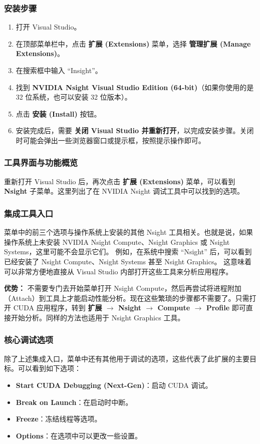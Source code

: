 \subsubsection{安装步骤}
\begin{enumerate}
    \item 打开 Visual Studio。
    \item 在顶部菜单栏中，点击 \textbf{扩展 (Extensions)} 菜单，选择 \textbf{管理扩展 (Manage Extensions)}。
    \item 在搜索框中输入 ``Insight''。
    \item 找到 \textbf{NVIDIA Nsight Visual Studio Edition (64-bit)}（如果你使用的是 32 位系统，也可以安装 32 位版本）。
    \item 点击 \textbf{安装 (Install)} 按钮。
    \item 安装完成后，需要 \textbf{关闭 Visual Studio 并重新打开}，以完成安装步骤。关闭时可能会弹出一些浏览器窗口或提示框，按照提示操作即可。
\end{enumerate}


\subsubsection{工具界面与功能概览}
重新打开 Visual Studio 后，再次点击 \textbf{扩展 (Extensions)} 菜单，可以看到 \textbf{Nsight} 子菜单。这里列出了在 NVIDIA Nsight 调试工具中可以找到的选项。

\subsubsection{集成工具入口}
菜单中的前三个选项与操作系统上安装的其他 Nsight 工具相关。也就是说，如果操作系统上未安装 NVIDIA Nsight Compute、Nsight Graphics 或 Nsight Systems，这里可能不会显示它们。
例如，在系统中搜索 ``Nsight'' 后，可以看到已经安装了 Nsight Compute、Nsight Systems 甚至 Nsight Graphics。
这意味着可以非常方便地直接从 Visual Studio 内部打开这些工具来分析应用程序。

\textbf{优势：} 不需要专门去开始菜单打开 Nsight Compute，然后再尝试将进程附加（Attach）到工具上才能启动性能分析。现在这些繁琐的步骤都不需要了。只需打开 CUDA 应用程序，转到 \textbf{扩展 $\rightarrow$ Nsight $\rightarrow$ Compute $\rightarrow$ Profile}
即可直接开始分析。同样的方法也适用于 Nsight Graphics 工具。

\subsubsection{核心调试选项}
除了上述集成入口，菜单中还有其他用于调试的选项，这些代表了此扩展的主要目标。可以看到如下选项：
\begin{itemize}
    \item \textbf{Start CUDA Debugging (Next-Gen)}：启动 CUDA 调试。
    \item \textbf{Break on Launch}：在启动时中断。
    \item \textbf{Freeze}：冻结线程等选项。
    \item \textbf{Options}：在选项中可以更改一些设置。
\end{itemize}

